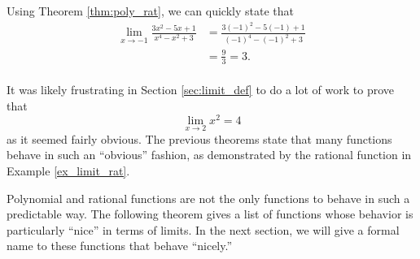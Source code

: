 \enlargethispage{1\baselineskip}

{Using Theorem \ref{thm:poly_rat}, we can quickly state that 
	\begin{align*} \lim_{x\to -1}\frac{3x^2-5x+1}{x^4-x^2+3} &= \frac{3(-1)^2-5(-1)+1}{(-1)^4-(-1)^2+3} \\
												&= \frac{9}{3} =3.
	\end{align*}
\baselineskip
}\\

It was likely frustrating in Section \ref{sec:limit_def} to do a lot of work to prove that $$\lim_{x\to 2} x^2 = 4$$ as it seemed fairly obvious. The previous theorems state that many functions behave in such an ``obvious'' fashion, as demonstrated by the rational function in Example \ref{ex_limit_rat}. 

Polynomial and rational functions are not the only functions to behave in such a predictable way. The following theorem gives a list of functions whose behavior is particularly ``nice'' in terms of limits. In the next section, we will give a formal name to these functions that behave ``nicely.''

